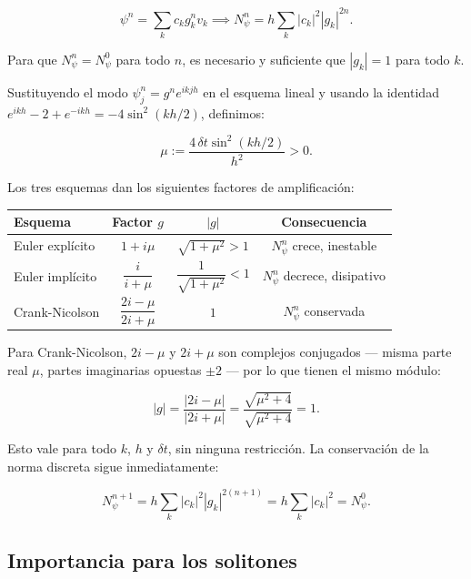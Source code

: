 \documentclass[letterpaper,11pt]{exam}
\theoremstyle{plain}
\begin{document}
\begin{equation*}
    \psi^n = \sum_k c_k g_k^n v_k \implies 
    N_\psi^n = h\sum_k|c_k|^2|g_k|^{2n}.
\end{equation*}

Para que $N_\psi^n = N_\psi^0$ para todo $n$, es necesario 
y suficiente que $|g_k|=1$ para todo $k$.

Sustituyendo el modo $\psi_j^n = g^n e^{ikjh}$ en el esquema 
lineal y usando la identidad $e^{ikh}-2+e^{-ikh} = 
-4\sin^2(kh/2)$, definimos:

\begin{equation}
    \mu := \frac{4\,\delta t\sin^2(kh/2)}{h^2} > 0.
\end{equation}

Los tres esquemas dan los siguientes factores de amplificación:

\begin{center}
\renewcommand{\arraystretch}{2.2}
\begin{tabular}{|l|c|c|c|}
\hline
\textbf{Esquema} & \textbf{Factor} $g$ & $|g|$ & 
\textbf{Consecuencia} \\
\hline
Euler explícito & $1+i\mu$ & $\sqrt{1+\mu^2}>1$ & 
$N_\psi^n$ crece, inestable \\
\hline
Euler implícito & $\dfrac{i}{i+\mu}$ & 
$\dfrac{1}{\sqrt{1+\mu^2}}<1$ & 
$N_\psi^n$ decrece, disipativo \\
\hline
Crank-Nicolson & $\dfrac{2i-\mu}{2i+\mu}$ & $1$ & 
$N_\psi^n$ conservada \\
\hline
\end{tabular}
\end{center}

Para Crank-Nicolson, $2i-\mu$ y $2i+\mu$ son complejos 
conjugados — misma parte real $\mu$, partes imaginarias 
opuestas $\pm 2$ — por lo que tienen el mismo módulo:

\begin{equation*}
    |g| = \frac{|2i-\mu|}{|2i+\mu|} = 
    \frac{\sqrt{\mu^2+4}}{\sqrt{\mu^2+4}} = 1.
\end{equation*}

Esto vale para todo $k$, $h$ y $\delta t$, sin ninguna 
restricción. La conservación de la norma discreta sigue 
inmediatamente:

\begin{equation*}
    N_\psi^{n+1} = h\sum_k|c_k|^2|g_k|^{2(n+1)} = 
    h\sum_k|c_k|^2 = N_\psi^0.
\end{equation*}

\subsection{Importancia para los solitones}
\end{document}

